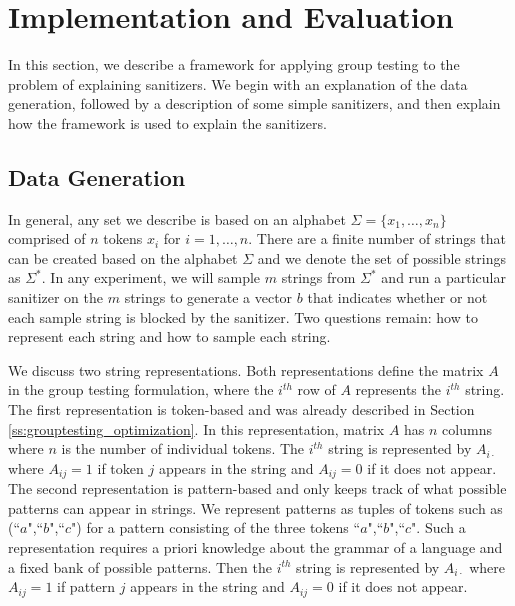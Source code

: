 \section{Implementation and Evaluation}
In this section, we describe a framework for applying group testing to the problem of explaining sanitizers. We begin with an explanation of the data generation, followed by a description of some simple sanitizers, and then explain how the framework is used to explain the sanitizers.

\subsection{Data Generation}
In general, any set we describe is based on an alphabet $\Sigma=\{x_1,\ldots,x_n\}$ comprised of $n$ tokens $x_i$ for $i=1,\ldots,n$. There are a finite number of strings that can be created based on the alphabet $\Sigma$ and we denote the set of possible strings as $\Sigma^*$. In any experiment, we will sample $m$ strings from $\Sigma^*$ and run a particular sanitizer on the $m$ strings to generate a vector $b$ that indicates whether or not each sample string is blocked by the sanitizer. Two questions remain: how to represent each string and how to sample each string. 

We discuss two string representations. Both representations define the matrix $A$ in the group testing formulation, where the $i^{th}$ row of $A$ represents the $i^{th}$ string. The first representation is token-based and was already described in Section \ref{ss:grouptesting_optimization}. In this representation, matrix $A$ has $n$ columns where $n$ is the number of individual tokens. The $i^{th}$ string is represented by $A_{i\cdot}$ where $A_{ij}=1$ if token $j$ appears in the string and $A_{ij}=0$ if it does not appear. The second representation is pattern-based and only keeps track of what possible patterns can appear in strings. We represent patterns as tuples of tokens such as (``$a$",``$b$",``$c$") for a pattern consisting of the three tokens ``$a$",``$b$",``$c$". Such a representation requires a priori knowledge about the grammar of a language and a fixed bank of possible patterns. Then the $i^{th}$ string is represented by $A_{i\cdot}$ where $A_{ij}=1$ if pattern $j$ appears in the string and $A_{ij}=0$ if it does not appear.

